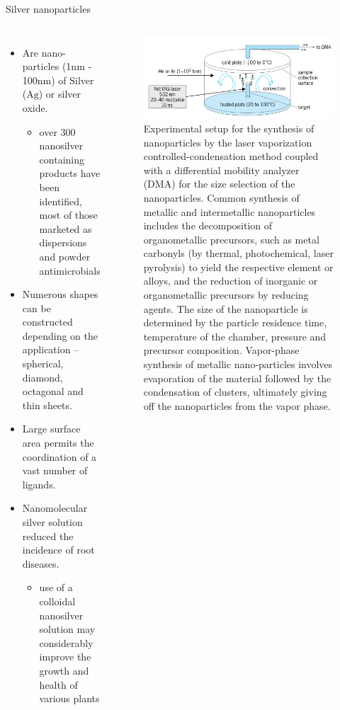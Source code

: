 \documentclass[11pt,dvipsnames,ignorenonframetext,aspectratio=169]{beamer}
\providecommand{\tightlist}{%
  \setlength{\itemsep}{0pt}\setlength{\parskip}{0pt}}
\newcommand{\bcolumns}{\begin{columns}[T, onlytextwidth]}
\newcommand{\ecolumns}{\end{columns}}
\begin{document}
\begin{frame}{Silver nanoparticles}
\protect\hypertarget{silver-nanoparticles}{}
\bcolumns
{}
\footnotesize

\begin{itemize}
\tightlist
\item
  Are nano-particles (1nm - 100nm) of Silver (\(\mathrm{Ag}\)) or silver
  oxide.

  \begin{itemize}
  \footnotesize
  \item over 300 nanosilver containing products have been identified, most of those marketed as dispersions and powder antimicrobials
  \end{itemize}
\item
  Numerous shapes can be constructed depending on the application --
  spherical, diamond, octagonal and thin sheets.
\item
  Large surface area permits the coordination of a vast number of
  ligands.
\item
  Nanomolecular silver solution reduced the incidence of root diseases.

  \begin{itemize}
  \tightlist
  \item
    use of a colloidal nanosilver solution may considerably improve the
    growth and health of various plants
  \end{itemize}
\end{itemize}


\begin{figure}
\includegraphics[width=0.75\linewidth]{../images/nanoparticles_synthesis_laser_vaporization} \caption{Experimental setup for the synthesis of nanoparticles by the laser vaporization controlled-condensation method coupled with a differential mobility analyzer (DMA) for the size selection of the nanoparticles. Common synthesis of metallic and intermetallic nanoparticles includes the decomposition of organometallic precursors, such as metal carbonyls (by thermal, photochemical, laser pyrolysis) to yield the respective element or alloys, and the reduction of inorganic or organometallic precursors by reducing agents. The size of the nanoparticle is determined by the particle residence time, temperature of the chamber, pressure and precursor composition. Vapor-phase synthesis of metallic nano-particles involves evaporation of the material followed by the condensation of clusters, ultimately giving off the nanoparticles from the vapor phase.}\label{fig:nanoparticle-synthesis-laser-vapor}
\end{figure}

\ecolumns
\end{frame}
\end{document}

